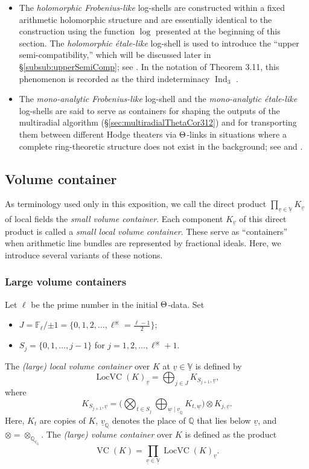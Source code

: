 \documentclass[12pt, reqno, a4paper]{amsart}
\def\udl#1{\underline{#1}} %
\def\bQ{\mathbb{Q}} %
\def\bV{\mathbb{V}}
\def\uV{\udl{\bV}} %
\def\uv{\udl{v}} %
\DeclareMathOperator{\VC}{VC}
\DeclareMathOperator{\LocVC}{LocVC}
\DeclareMathOperator{\Ind}{Ind}
\def\IndThree{\Ind_3}
\begin{document}
\begin{itemize}
\item The \emph{holomorphic Frobenius-like} log-shells are constructed within a fixed arithmetic holomorphic structure and are essentially identical to the construction using the function $\log$ presented at the beginning of this section.
The \emph{holomorphic {\'e}tale-like} log-shell is used to introduce the ``upper semi-compatibility,'' which will be discussed later in \S\ref{subsub:upperSemiComp}; see \cite[Rem.~1.2.2(iii), pp.\ 442--443; Prop.~3.5(ii), pp. 517--520]{MR4225475}. In the notation of Theorem 3.11, this phenomenon is recorded as the third indeterminacy \(\IndThree\) \cite[Thm.\ 3.11(ii), pp. 577]{MR4225475}.

\item The \emph{mono-analytic Frobenius-like} log-shell and the \emph{mono-analytic {\'e}tale-like} log-shells are said to serve as containers for shaping the outputs of the multiradial algorithm (\S\ref{sec:multiradialThetaCor312}) and for transporting them between different Hodge theaters via $\Th$-links in situations where a complete ring-theoretic structure does not exist in the background; see \cite[Thm.~1.5(iii),(iv), pp.\ 455--457]{MR4225475} and \cite[Rem.~1.5.2(i), pp.\ 460--461]{MR4225475}. 
\end{itemize}

\subsection{Volume container}\label{sub:valueContainer}

As terminology used only in this exposition, we call the direct product $\prod_{\uv\in\uV} K_{\uv}$ of local fields the \emph{small volume container}. Each component $K_{\uv}$ of this direct product is called a \emph{small local volume container}. These serve as “containers” when arithmetic line bundles are represented by fractional ideals. Here, we introduce several variants of these notions.

\subsubsection{Large volume containers}\label{subsub:largeAndSmallVC}
Let $\ell$ be the prime number in the initial $\Th$-data. Set
\begin{itemize}
    \item $J=\mathbb{F}_{\ell}/\mathord{\pm} 1=\{0,1,2,\ldots,\ell^{\divideontimes}=\frac{\ell-1}{2}\}$;
    \item $S_j=\{0,1,\ldots,j-1\}$ for $j=1,2,\ldots,\ell^{\divideontimes}+1$.
\end{itemize}
The \emph{(large) local volume container} over $K$ at $\uv\in\uV$ is defined by
$$
\LocVC(K)_{\uv}=\bigoplus_{j\in J} K_{S_{j+1},\uv},
$$
where 
\[
K_{S_{j+1},\uv}=\bigl(\bigotimes_{t\in S_j}\bigoplus_{\underline{w}\mid \uv_\mathbb{Q}}K_{t,\underline{w}}\bigr)\otimes K_{j,\uv}.
\]
Here, $K_t$ are copies of $K$, $\uv_{\bQ}$ denotes the place of $\bQ$ that lies below $\uv$, and $\otimes=\otimes_{\mathbb{Q}_{\uv_{\mathbb{Q}}}}$.
The \emph{(large) volume container} over $K$ is defined as the product
$$
\VC(K)=\prod_{\uv\in\udl{\mathbb{V}}}\LocVC(K)_{\uv}.
$$
\end{document}
